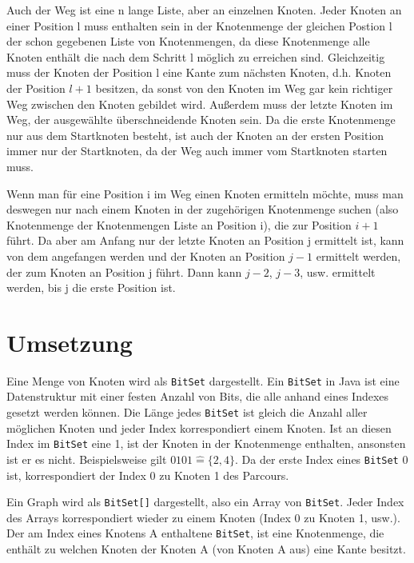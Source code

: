 \documentclass[a4paper,10pt,ngerman]{scrartcl}
\begin{document}
    Auch der Weg ist eine n lange Liste,
    aber an einzelnen Knoten.
    Jeder Knoten an einer Position l muss enthalten sein
    in der Knotenmenge der gleichen Postion l der schon gegebenen Liste von Knotenmengen,
    da diese Knotenmenge alle Knoten enthält die nach dem Schritt l möglich zu erreichen sind.
    Gleichzeitig muss der Knoten der Position l eine Kante zum nächsten Knoten,
    d.h. Knoten der Position $l + 1$ besitzen,
    da sonst von den Knoten im Weg
    gar kein richtiger Weg zwischen den Knoten gebildet wird.
    Außerdem muss der letzte Knoten im Weg,
    der ausgewählte überschneidende Knoten sein.
    Da die erste Knotenmenge nur aus dem Startknoten besteht,
    ist auch der Knoten an der ersten Position immer nur der Startknoten,
    da der Weg auch immer vom Startknoten starten muss.

    Wenn man für eine Position i im Weg einen Knoten ermitteln möchte,
    muss man deswegen nur nach einem Knoten in der zugehörigen Knotenmenge suchen
    (also Knotenmenge der Knotenmengen Liste an Position i),
    die zur Position $i + 1$ führt.
    Da aber am Anfang nur der letzte Knoten an Position j ermittelt ist,
    kann von dem angefangen werden und der Knoten an Position $j - 1$ ermittelt werden,
    der zum Knoten an Position j führt.
    Dann kann $j - 2$, $j - 3$, usw. ermittelt werden,
    bis j die erste Position ist.


    \section{Umsetzung}\label{sec:umsetzung}
	Eine Menge von Knoten wird als \texttt{BitSet} dargestellt.
	Ein \texttt{BitSet} in Java ist eine Datenstruktur mit einer festen Anzahl von Bits,
	die alle anhand eines Indexes gesetzt werden können.
	Die Länge jedes \texttt{BitSet} ist gleich die Anzahl aller möglichen Knoten
	und jeder Index korrespondiert einem Knoten.
	Ist an diesen Index im \texttt{BitSet} eine 1,
	ist der Knoten in der Knotenmenge enthalten, ansonsten ist er es nicht.
	Beispielsweise gilt $0101 \widehat{=} \{2, 4\}$.
	Da der erste Index eines \texttt{BitSet} 0 ist,
	korrespondiert der Index 0 zu Knoten 1 des Parcours.
	
	Ein Graph wird als \texttt{BitSet[]} dargestellt, also ein Array von \texttt{BitSet}.
	Jeder Index des Arrays korrespondiert wieder zu einem Knoten (Index 0 zu Knoten 1, usw.).
	Der am Index eines Knotens A enthaltene \texttt{BitSet}, ist eine Knotenmenge,
	die enthält zu welchen Knoten der Knoten A (von Knoten A aus) eine Kante besitzt.
	
\end{document}
